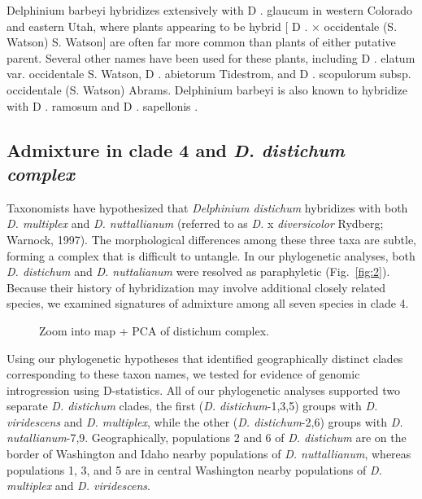 \documentclass[11pt]{article}
\begin{document}
Delphinium barbeyi hybridizes extensively with D . glaucum in western Colorado and eastern Utah, where plants appearing to be hybrid [ D . × occidentale (S. Watson) S. Watson] are often far more common than plants of either putative parent. Several other names have been used for these plants, including D . elatum var. occidentale S. Watson, D . abietorum Tidestrom, and D . scopulorum subsp. occidentale (S. Watson) Abrams. Delphinium barbeyi is also known to hybridize with D . ramosum and D . sapellonis .


\subsection{Admixture in clade 4 and \emph{D. distichum complex}}
Taxonomists have hypothesized that \emph{Delphinium distichum} hybridizes with both 
\emph{D. multiplex} and \emph{D. nuttallianum} 
(referred to as \emph{D.} x \emph{diversicolor} Rydberg; Warnock, 1997).
% 
The morphological differences among these three taxa are subtle, forming a complex that 
is difficult to untangle. 
% 
In our phylogenetic analyses, both \emph{D. distichum} and \emph{D. nuttalianum} were
resolved as paraphyletic (Fig.~\ref{fig:2}). Because their history of hybridization
may involve additional closely related species, we examined signatures of admixture
among all seven species in clade 4. 
% 

\begin{figure}[t]
	\centering
	\caption{
        Zoom into map + PCA of distichum complex.
	}
	\label{fig:4}
\end{figure}



Using our phylogenetic hypotheses that identified geographically distinct clades corresponding
to these taxon names, we tested for evidence of genomic introgression using D-statistics. 
All of our phylogenetic analyses supported two separate 
\emph{D. distichum} clades, the first (\emph{D. distichum}-1,3,5) groups with 
\emph{D. viridescens} and \emph{D. multiplex}, while the other 
(\emph{D. distichum}-2,6) groups with \emph{D. nutallianum}-7,9. 
Geographically, populations 2 and 6 of \emph{D. distichum} are on the border of 
Washington and Idaho nearby populations of \emph{D. nuttallianum}, whereas 
populations 1, 3, and 5 are in central Washington nearby populations of 
\emph{D. multiplex} and \emph{D. viridescens}. 
\end{document}
